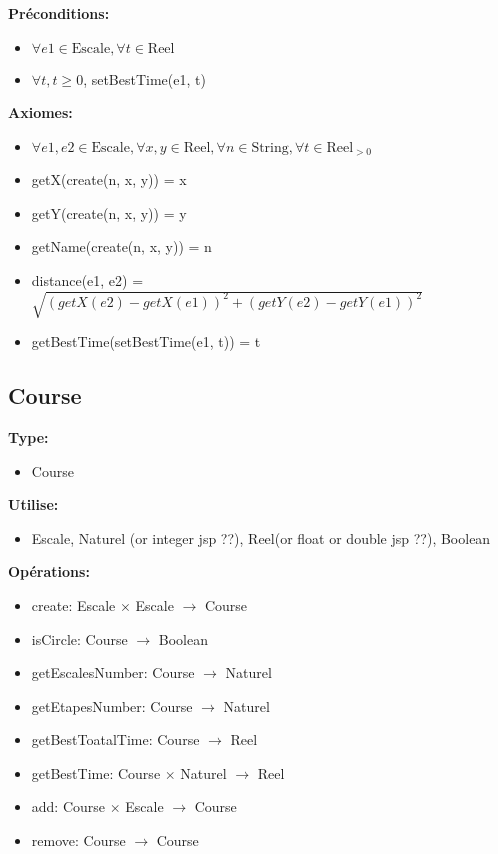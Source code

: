 \documentclass[a4paper, 11pt, oneside]{article}
\begin{document}
\textbf{Préconditions:}
\begin{itemize}
    \item[] $\forall e1 \in \text{Escale}, \forall t \in \text{Reel}$
    \item[] $\forall t, t \geq 0$, setBestTime(e1, t)
\end{itemize}

\textbf{Axiomes:}
\begin{itemize}
    \item[] $\forall e1, e2 \in \text{Escale}, \forall x, y \in \text{Reel}, \forall n \in \text{String}, \forall t \in \text{Reel}_{>0}$
    \item[] getX(create(n, x, y)) = x
    \item[] getY(create(n, x, y)) = y
    \item[] getName(create(n, x, y)) = n
    \item[] distance(e1, e2) = $\sqrt{(getX(e2) - getX(e1))^2 + (getY(e2) - getY(e1))^2}$
    \item[] getBestTime(setBestTime(e1, t)) = t
\end{itemize}

\subsection{Course}

\textbf{Type:}
\begin{itemize}
    \item[] Course
\end{itemize}

\textbf{Utilise:}
\begin{itemize}
    \item[] Escale, Naturel (or integer jsp ??), Reel(or float or double jsp ??), Boolean
\end{itemize}

\textbf{Opérations:}
\begin{itemize}
    \item[] create: Escale $\times$ Escale $\to$ Course
    \item[] isCircle: Course $\to$ Boolean
    \item[] getEscalesNumber: Course $\to$ Naturel
    \item[] getEtapesNumber: Course $\to$ Naturel
    \item[] getBestToatalTime: Course $\to$ Reel
    \item[] getBestTime: Course $\times$ Naturel $\to$ Reel
    \item[] add: Course $\times$ Escale $\to$ Course
    \item[] remove: Course $\to$ Course
\end{itemize}
\end{document}
